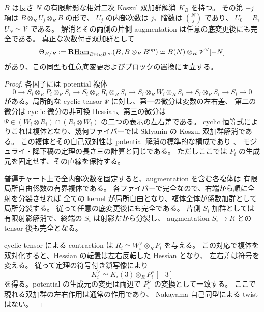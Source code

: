 \begin{theorem}
\label{mbsd:thm:ambient-duality}
$B$ は長さ $N$ の有限射影な相対二次 Koszul 双加群解消 $K_B$ を持つ。
その第 $-j$ 項は $B\otimes_RU_j\otimes_RB$ の形で、
$U_j$ の内部次数は $j$、階数は $\binom Nj$ であり、
$U_0=R$, $U_N\simeq\mathscr V$ である。
解消とその両側の片側 augmentation は任意の底変更後にも完全である。
真正な次数付き双加群として
\begin{equation}\label{mbsd:eq:ambient-duality}
 \Theta_{B/R}:=
 \mathbf R\underline{\operatorname{Hom}}_{B\otimes_RB^{\mathrm{op}}}
       (B,B\otimes_RB^{\mathrm{op}})
 \simeq B(N)\otimes_R\mathscr V^\vee[-N]
\end{equation}
があり、この同型も任意底変更およびブロックの置換に両立する。
\end{theorem}
\begin{proof}
各因子には potential 複体
\[
 0\longrightarrow S_i\otimes_RP_i\otimes_RS_i
 \longrightarrow S_i\otimes_RR_i\otimes_RS_i
 \longrightarrow S_i\otimes_RW_i\otimes_RS_i
 \longrightarrow S_i\otimes_RS_i\longrightarrow S_i\longrightarrow0
\]
がある。局所的な cyclic tensor $\Psi$ に対し、第一の微分は変数の左右差、
第二の微分は cyclic 微分の非可換 Hessian、第三の微分は
$\Psi\in(W_i\otimes R_i)\cap(R_i\otimes W_i)$ の二つの表示の左右差である。
cyclic 恒等式によりこれは複体となり、幾何ファイバーでは Sklyanin の
Koszul 双加群解消である。
この複体とその自己双対性は potential 解消の標準的な構成であり
\cite[Theorem~3.6 の証明、Lemma~3.7]{NFMBeTa}、
モジュライ・降下稿の定理の長さ三の計算と同じである。
ただしここでは $P_i$ の生成元を固定せず、その直線を保持する。

普遍チャート上で全内部次数を固定すると、augmentation を含む各複体は
有限局所自由係数の有界複体である。
各ファイバーで完全なので、右端から順に全射を分裂させれば
全ての kernel が局所自由となり、複体全体が係数加群として局所分裂する。
従って任意の底変更後にも完全である。
片側 $S_i$-加群としては有限射影解消で、終端の $S_i$ は射影だから分裂し、
augmentation $S_i\to R$ との tensor 後も完全となる。

cyclic tensor による contraction は $R_i\simeq W_i^\vee\otimes_RP_i$ を与える。
この対応で複体を双対化すると、Hessian の転置は左右反転した Hessian となり、
左右差は符号を変える。
従って定理の符号付き鎖写像により
\[
 K_i^\vee\simeq K_i(3)\otimes_RP_i^\vee[-3]
\]
を得る。potential の生成元の変更は両辺で $P_i^\vee$ の変換として一致する。
ここで現れる双加群の左右作用は通常の作用であり、
Nakayama 自己同型による twist はない。


\end{proof}
